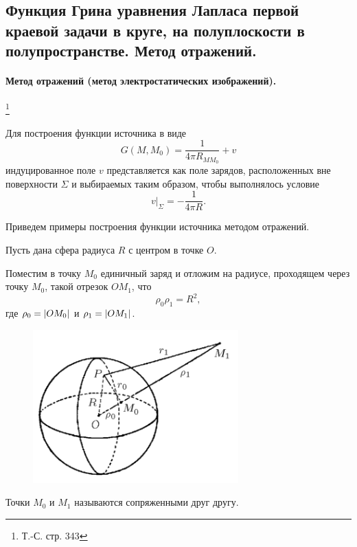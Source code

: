 \subsection{Функция Грина уравнения Лапласа первой краевой задачи в круге, на полуплоскости в полупространстве. Метод отражений.}

\paragraph{Метод отражений (метод электростатических изображений).}\footnote{Т.-С. стр. 343}

Для построения функции источника в виде
\begin{equation*}
	G(M, M_0) = \frac{1}{4 \pi R_{M M_0}} + v
\end{equation*}
индуцированное поле $v$ представляется как поле зарядов, расположенных вне поверхности $\Sigma$ и выбираемых таким образом, чтобы выполнялось условие
\begin{equation*}
	v|_{\Sigma} = -\frac{1}{4 \pi R}.
\end{equation*}

Приведем примеры построения функции источника методом отражений.

Пусть дана сфера радиуса $R$ с центром в точке $O$.

Поместим в точку $M_0$ единичный заряд и отложим на радиусе, проходящем через точку $M_0$, такой отрезок $OM_1$, что
\begin{equation} \label{section}
	\rho_0 \rho_1 = R^2,
\end{equation}
где $\rho_0 = \abs{OM_0}$ и $\rho_1 = \abs{OM_1}$. 

\begin{figure}[H]
	\centering
	\includegraphics[width=0.4\linewidth]{img/sphere_green}
	\caption{}
\end{figure}

Точки $M_0$ и $M_1$ называются сопряженными друг другу. 

